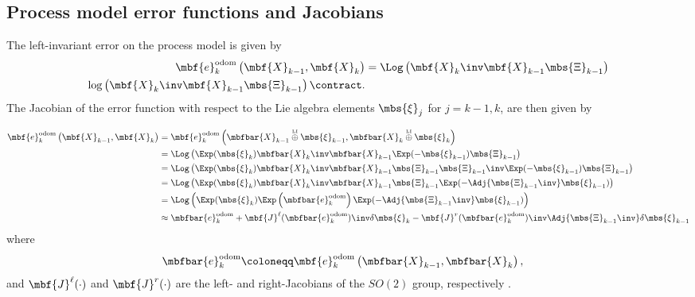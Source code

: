 \documentclass[ nobib, nofonts, notoc]{tufte-handout}
\newcommand{\liplus}{\overset{{\scriptscriptstyle\mathrm{LI}}}{\oplus}}
\begin{document}
    \subsection{Process model error functions and Jacobians}
    The left-invariant error on the process model is given by
    \begin{align}
        \mbf{e}^{\mathrm{odom}}_{k}\left( \mbf{X}_{k-1}, \mbf{X}_{k} \right) &= 
        \Log\left( \mbf{X}_{k}\inv\mbf{X}_{k-1}\mbs{\Xi}_{k-1} \right)\\
        \log\left( \mbf{X}_{k}\inv\mbf{X}_{k-1}\mbs{\Xi}_{k-1} \right)\contract.
    \end{align}
    The Jacobian of the error function with respect to the Lie algebra elements $\mbs{\xi}_{j}$ for $j=k - 1, k$, are then given by
    \begin{fullwidth}    
        \begin{align}
            \mbf{e}^{\mathrm{odom}}_{k}
              \left( \mbf{X}_{k-1}, \mbf{X}_{k} \right) 
            &=
            \mbf{e}^{\mathrm{odom}}_{k}
              \left( \mbfbar{X}_{k-1}\liplus\mbs{\xi}_{k-1}, \mbfbar{X}_{k} \liplus\mbs{\xi}_{k}\right) \\
            &=
            \Log\left( \Exp(\mbs{\xi}_{k})
              \mbfbar{X}_{k}\inv
              \mbfbar{X}_{k-1}
              \Exp(-\mbs{\xi}_{k-1})
              \mbs{\Xi}_{k-1} 
            \right)\\
            &= 
            \Log\left( 
              \Exp(\mbs{\xi}_{k})
              \mbfbar{X}_{k}\inv
              \mbfbar{X}_{k-1}
              \mbs{\Xi}_{k-1}
              \mbs{\Xi}_{k-1}\inv
              \Exp(-\mbs{\xi}_{k-1})
              \mbs{\Xi}_{k-1} 
            \right)\\
            &= 
            \Log\left( 
              \Exp(\mbs{\xi}_{k})
              \mbfbar{X}_{k}\inv
              \mbfbar{X}_{k-1}
              \mbs{\Xi}_{k-1}
              \Exp(-\Adj{\mbs{\Xi}_{k-1}\inv}
              \mbs{\xi}_{k-1})
            \right)\\
            &= 
            \Log\left( \Exp(\mbs{\xi}_{k})\Exp\left( \mbfbar{e}^{\mathrm{odom}}_{k}\right)\Exp(-\Adj{\mbs{\Xi}_{k-1}\inv}\mbs{\xi}_{k-1})\right)\\
            &\approx
            \mbfbar{e}^{\mathrm{odom}}_{k} + 
            \mbf{J}^{\ell}(\mbfbar{e}^{\mathrm{odom}}_{k})\inv
            \delta\mbs{\xi}_{k} 
            -\mbf{J}^{r}(\mbfbar{e}^{\mathrm{odom}}_{k})\inv
            \Adj{\mbs{\Xi}_{k-1}\inv}
            \delta\mbs{\xi}_{k-1}
        \end{align}
        where 
        \begin{align}
            \mbfbar{e}^{\mathrm{odom}}_{k} 
            &\coloneqq \mbf{e}^{\mathrm{odom}}_{k}\left( \mbfbar{X}_{k-1}, \mbfbar{X}_{k} \right),
        \end{align}
        and $\mbf{J}^{\ell}(\cdot)$ and $\mbf{J}^{r}(\cdot)$ are the left- and right-Jacobians of the $SO(2)$ group, respectively \cite{Barfoot_State_2017a}.
    \end{fullwidth}    
\end{document}
